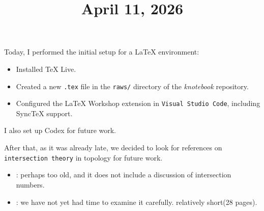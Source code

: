 \documentclass[11pt]{amsart}
\title{April 11, 2026}
\begin{document}
\maketitle

Today, I performed the initial setup for a LaTeX environment:
\begin{itemize}
    \item Installed TeX Live.
    \item Created a new \texttt{.tex} file in the \texttt{raws/} directory of the \textit{knotebook} repository.
    \item Configured the LaTeX Workshop extension in \texttt{Visual Studio Code}, including SyncTeX support.
\end{itemize}

I also set up Codex for future work. %
\par\vspace{1em}
After that, as it was already late, we decided to look for references on \texttt{intersection theory} in topology for future work.
\begin{itemize}
    \item \cite{Milnor_Topology-differentiable-viewpoint}: perhaps too old, and it does not include a discussion of intersection numbers.
    \item \cite{Goresky_Intersection-homology-theory}: we have not yet had time to examine it carefully. relatively short(28 pages).
\end{itemize}




\end{document}
